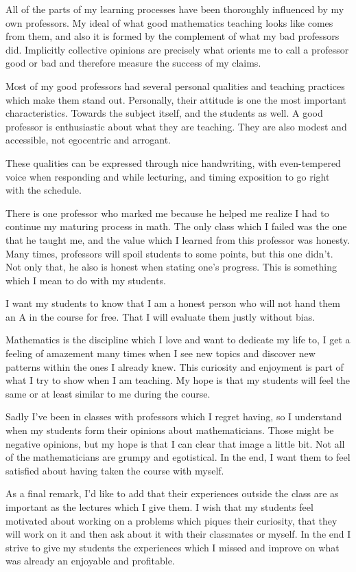 \documentclass[a4paper,12pt,final]{book}
\begin{document}
All of the parts of my learning processes have been thoroughly influenced by my own professors. My ideal of what good mathematics teaching looks like comes from them, and also it is formed by the complement of what my bad professors did. Implicitly collective opinions are precisely what orients me to call a professor good or bad and therefore measure the success of my claims.\par 
Most of my good professors had several personal qualities and teaching practices which make them stand out. Personally, their attitude is one the most important characteristics. Towards the subject itself, and the students as well. A good professor is enthusiastic about what they are teaching. They are also modest and accessible, not egocentric and arrogant.\par
These qualities can be expressed through nice handwriting, with even-tempered voice when responding and while lecturing, and timing exposition to go right with the schedule.\par
There is one professor who marked me because he helped me realize I had to continue my maturing process in math. The only class which I failed was the one that he taught me, and the value which I learned from this professor was honesty. Many times, professors will spoil students to some points, but this one didn't. Not only that, he also is honest when stating one's progress. This is something which I mean to do with my students.\par 
I want my students to know that I am a honest person who will not hand them an A in the course for free. That I will evaluate them justly without bias.\par 
Mathematics is the discipline which I love and want to dedicate my life to, I get a feeling of amazement many times when I see new topics and discover new patterns within the ones I already knew. This curiosity and enjoyment is part of what I try to show when I am teaching. My hope is that my students will feel the same or at least similar to me during the course.\par 
Sadly I've been in classes with professors which I regret having, so I understand when my students form their opinions about mathematicians. Those might be negative opinions, but my hope is that I can clear that image a little bit. Not all of the mathematicians are grumpy and egotistical. In the end, I want them to feel satisfied about having taken the course with myself.\par 
As a final remark, I'd like to add that their experiences outside the class are as important as the lectures which I give them. I wish that my students feel motivated about working on a problems which piques their curiosity, that they will work on it and then ask about it with their classmates or myself. In the end I strive to give my students the experiences which I missed and improve on what was already an enjoyable and profitable.
\end{document}
